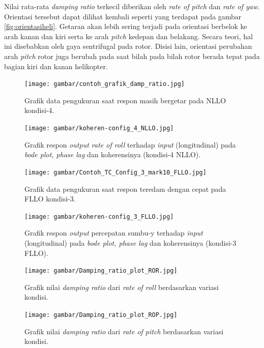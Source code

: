 Nilai rata-rata \textit{damping ratio} terkecil diberikan oleh \textit{rate of pitch} dan \textit{rate of yaw}. Orientasi tersebut dapat dilihat kembali seperti yang terdapat pada gambar \ref{fig:orientasiheli}. Getaran akan lebih sering terjadi pada orientasi berbelok ke arah kanan dan kiri serta ke arah \textit{pitch} kedepan dan belakang. Secara teori, hal ini disebabkan oleh gaya sentrifugal pada rotor. Disisi lain, orientasi perubahan arah \textit{pitch} rotor juga berubah pada saat bilah pada bilah rotor berada tepat pada bagian kiri dan kanan helikopter.

\begin{figure}[H]
	\centering
	\texttt{[image: gambar/contoh\_grafik\_damp\_ratio.jpg]}
	\caption{Grafik data pengukuran saat respon masih bergetar pada NLLO kondisi-4.}
	\label{fig:NLLO-4}
\end{figure}

\begin{figure}[H]
	\centering
	\texttt{[image: gambar/koheren-config\_4\_NLLO.jpg]}
	\caption{Grafik respon \textit{output rate of roll} terhadap \textit{input} (longitudinal) pada \textit{bode plot, phase lag} dan koherensinya (kondisi-4 NLLO).}
	\label{fig:koheren-4_NLLO-4}
\end{figure}

\begin{figure}[H]
	\centering
	\texttt{[image: gambar/Contoh\_TC\_Config\_3\_mark10\_FLLO.jpg]}
	\caption{Grafik data pengukuran saat respon teredam dengan cepat pada FLLO kondisi-3.}
	\label{fig:FLLO-3_mark10}
\end{figure}

\begin{figure}[H]
	\centering
	\texttt{[image: gambar/koheren-config\_3\_FLLO.jpg]}
	\caption{Grafik respon \textit{output} percepatan sumbu-y terhadap \textit{input} (longitudinal) pada \textit{bode plot, phase lag} dan koherensinya (kondisi-3 FLLO).}
	\label{fig:koheren-3_FLLO}
\end{figure}



\begin{figure}[h]
	\centering
	\texttt{[image: gambar/Damping\_ratio\_plot\_ROR.jpg]}
	\caption{Grafik nilai \textit{damping ratio} dari \textit{rate of roll} berdasarkan variasi kondisi.}
	\label{fig:plot_ROR}
\end{figure}

\begin{figure}[H]
	\centering
	\texttt{[image: gambar/Damping\_ratio\_plot\_ROP.jpg]}
	\caption{Grafik nilai \textit{damping ratio} dari \textit{rate of pitch} berdasarkan variasi kondisi.}
	\label{fig:plot_ROP}
\end{figure}

